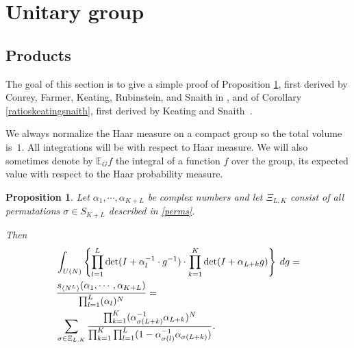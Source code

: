 \documentclass[11pt]{amsart}
\newtheorem{proposition}{Proposition}
\begin{document}
\section{Unitary group} \label{sec:3}
\subsection{Products}
The goal of this section is to give a simple proof of Proposition
\ref{cpaverage}, first derived by  Conrey, Farmer, Keating,
Rubinstein, and  Snaith  in \cite{CFKRS2}, and of Corollary
\ref{ratioskeatingsnaith}, first derived by Keating and
Snaith~{\cite{KS00a}}.


We always normalize the Haar measure on a compact group so the
total volume is~$1$. All integrations will be with respect to Haar
measure. We will also sometimes denote by $\mathbb{E}_G f$ the
integral of a function $f$ over the group, its expected value with
respect to the Haar probability measure.

\begin{proposition}
\label{cpaverage}Let $\alpha_1, \cdots, \alpha_{K+L}$ be complex
numbers and let $\Xi_{L, K}$ consist of all permutations $\sigma
\in S_{K + L}$ described in \eqref{perms}.

  Then
\begin{equation}\label{e:produ}
\begin{aligned}
& \int_{U ( N )}  \left\{ \prod_{l = 1}^L \det ( I + \alpha_l^{-
1} \cdot
   g^{- 1} ) \cdot \prod_{k = 1}^K \det ( I + \alpha_{L + k}g)\right\}  \hspace{0.25em} dg
   =\\
&  \frac{s_{\left\langle N^L \right\rangle}( \alpha_1, \cdots,
\alpha_{K+L})}{\prod_{l=1}^{L} (\alpha_l)^{N}}=
\\
   & \sum_{\sigma \in \Xi_{L, K}} \frac{\prod_{k = 1}^K ( \alpha_{\sigma ( L +
   k )}^{- 1} \alpha_{L + k} )^N } {\prod_{k = 1}^K \prod_{l = 1}^L ( 1 -
   \alpha_{\sigma ( l )}^{- 1} \alpha_{\sigma ( L + k )} )}  .
\end{aligned}
\end{equation}
\end{proposition}
\end{document}
